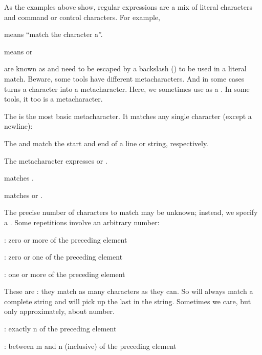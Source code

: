As the examples above show, regular expressions are a mix of literal
characters and command or control characters. For example,
\begin{compactitem}
\item {} means “match the character a”. 
\item \e{$|$} means or
\item {} are known as  and
need to be escaped by a backslash (\e{$\backslash$}) to be used in a literal match. Beware, some tools have different metacharacters. And in some cases \e{$\backslash$} turns a character into a metacharacter.
Here, we sometimes use \e{$/$} as a . In some tools, it too is
a metacharacter.
\item The   is the most basic metacharacter. It matches any single character (except a newline):
\item The  \e{\textasciicircum{}} and \e{\$} match the start and end of a line or string,
respectively.
\item The \e{$|$} metacharacter expresses  or . 
\begin{compactitem}
\item {} matches .
\item {} matches  or .
\end{compactitem}
\item The precise number of characters to match may be unknown; instead,
we specify a .
Some repetitions involve an arbitrary number: \begin{compactitem}
\item \e{*}: zero or more of the preceding element
\item {}: zero or one of the preceding element
\item \e{+}: one or more of the preceding element
\end{compactitem}
These are : they match as many characters as they can. So 
will always match a complete string and  will pick up the last  in
the string.
Sometimes we care, but only approximately, about number. \begin{compactitem}
\item {}: exactly n of the preceding element
\item {}: between m and n (inclusive) of the preceding element

\end{compactitem}
\end{compactitem}
